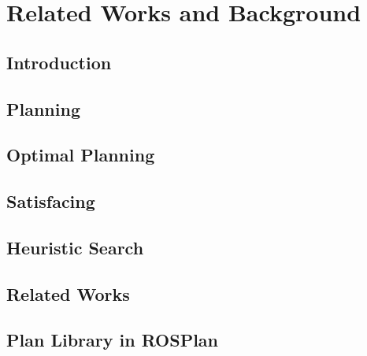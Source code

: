 
\chapter{Related Works and Background}

\ifpdf
    \graphicspath{{Chapter2/Figs/Raster/}{Chapter2/Figs/PDF/}{Chapter2/Figs/}}
\else
    \graphicspath{{Chapter2/Figs/Vector/}{Chapter2/Figs/}}
\fi


\section{Introduction}


\section{Planning}


\section{Optimal Planning}


\section{Satisfacing}


\section{Heuristic Search}


\section{Related Works}

\section{Plan Library in ROSPlan}




